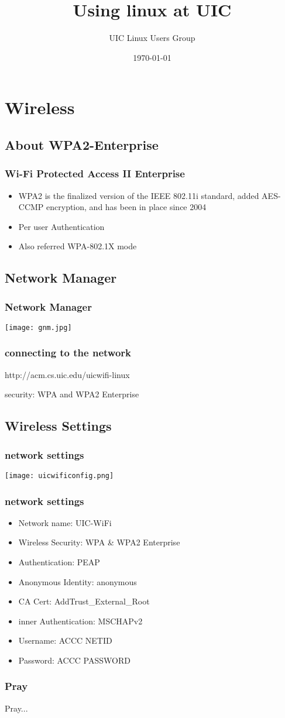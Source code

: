 \documentclass[hyperref={pdfpagelabels=false}]{beamer}
\title{Using linux at UIC}
\author{UIC Linux Users Group}
\date{\today}
\begin{document}
\frame{\titlepage}
\section{Wireless}
\subsection{About WPA2-Enterprise}
\frame
{
    \frametitle{Wi-Fi Protected Access II Enterprise}
    \begin{itemize}
    \item{WPA2 is the finalized version of the IEEE 802.11i standard, added AES-CCMP encryption, and has been in place since 2004}
    \item{Per user Authentication}
    \item{Also referred WPA-802.1X mode}
    \end{itemize}
}
\subsection{Network Manager}
\frame
{
    \frametitle{Network Manager}
    
    \texttt{[image: gnm.jpg]}

}
\frame
{
    \frametitle{connecting to the network}
    http://acm.cs.uic.edu/uicwifi-linux

    security: WPA and  WPA2 Enterprise
}
\subsection{Wireless Settings}
\frame
{
     \frametitle{network settings} 
     \texttt{[image: uicwificonfig.png]}
}
\frame
{
    \frametitle{network settings}
    \begin{itemize}
    \item{Network name: UIC-WiFi}
    \item{Wireless Security: WPA \& WPA2 Enterprise}
    \item{Authentication: PEAP}
    \item{Anonymous Identity: anonymous}
    \item{CA Cert: AddTrust\_External\_Root}
    \item{inner Authentication: MSCHAPv2}
    \item{Username: ACCC NETID}
    \item{Password: ACCC PASSWORD}
    \end{itemize}
}
\frame
{
    \frametitle{Pray}
    Pray...
}
\end{document}
